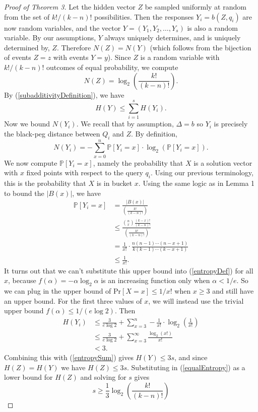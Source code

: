 \documentclass[12pt, a4paper]{article}
\begin{document}
\begin{proof}[Proof of Theorem 3]
	Let the hidden vector $Z$ be sampled uniformly at random from the set of $k!/(k-n)!$ possibilities. Then the responses $Y_i = b(Z, q_i)$ are now random variables, and the vector $Y = (Y_1, Y_2, \ldots, Y_s)$ is also a random variable. By our assumptions, $Y$ always uniquely determines, and is uniquely determined by, $Z$. Therefore $N(Z) = N(Y)$ (which follows from the bijection of events $Z=z$ with events $Y=y$). Since $Z$ is a random variable with $k!/(k-n)!$ outcomes of equal probability, we compute
	\begin{equation}\label{equalEntropy}
		N(Z) = \log_2\left(\frac{k!}{(k-n)!}\right).
	\end{equation}
	By (\ref{subadditivityDefinition}), we have
	\begin{equation}\label{entropySum}
		H(Y)\le\sum_{i=1}^s H(Y_i).
	\end{equation}
	Now we bound $N(Y_i)$. We recall that by assumption, $\Delta = b$ so $Y_i$ is precisely the black-peg distance between $Q_i$ and $Z$. By definition,
	\begin{equation}\label{entropyDef}
		N(Y_i)=-\sum_{x=0}^n \mathbb{P}[Y_i=x]\cdot\log_2(\mathbb{P}[Y_{i}=x]).
	\end{equation}
	We now compute $\mathbb{P}[Y_i=x]$, namely the probability that $X$ is a solution vector with $x$ fixed points with respect to the query $q_i$. Using our previous terminology, this is the probability that $X$ is in bucket $x$.
	Using the same logic as in Lemma 1 to bound the $|B(x)|$, we have
	\begin{align*}
		\mathbb{P}[Y_i = x] &= \frac{|B(x)|}{\left(\frac{k!}{(k-n)!}\right)}\\
		&\leq \frac{\binom{n}{x}\frac{(k-x)!}{(k-n)!}}{\left(\frac{k!}{(k-n)!}\right)}\\
		&= \frac{1}{x!}\cdot\frac{n(n-1)\cdots(n-x+1)}{k(k-1)\cdots(k-x+1)}\\
		&\leq \frac{1}{x!}.
	\end{align*}
	It turns out that we can't substitute this upper bound into  (\ref{entropyDef}) for all $x$, because $f(\alpha)=-\alpha\log_2\alpha$ is an increasing function only when $\alpha<1/e$. So we can plug in the upper bound of $\text{Pr}[X=x]\le 1/x!$ when $x\ge 3$ and still have an upper bound. For the first three values of $x$, we will instead use the trivial upper bound $f(\alpha)\le 1/(e\log 2)$. Then
	\begin{align*}
		H(Y_i) &\leq \frac{3}{e\log 2}+\sum_{x=3}^n-\frac{1}{x!}\cdot\log_2\left(\frac{1}{x!}\right)\\
		&\le \frac{3}{e\log 2}+\sum_{x=3}^\infty \frac{\log_2(x!)}{x!}\\
		&<3.
	\end{align*}
	Combining this with (\ref{entropySum}) gives $H(Y) \leq 3s$, and since $H(Z) = H(Y)$ we have $H(Z) \leq 3s$. Substituting in (\ref{equalEntropy}) as a lower bound for $H(Z)$ and solving for $s$ gives
	\begin{equation*}
	s \geq \frac{1}{3}\log_2\left(\frac{k!}{(k-n)!}\right)
	\end{equation*}
	

\end{proof}
\end{document}
